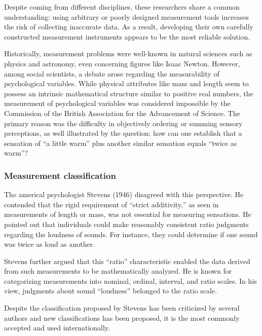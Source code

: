 \documentclass[
  letterpaper,
  DIV=11,
  numbers=noendperiod]{scrartcl}
\begin{document}
Despite coming from different disciplines, these researchers share a
common understanding: using arbitrary or poorly designed measurement
tools increases the risk of collecting inaccurate data. As a result,
developing their own carefully constructed measurement instruments
appears to be the most reliable solution.

Historically, measurement problems were well-known in natural sciences
such as physics and astronomy, even concerning figures like Isaac
Newton. However, among social scientists, a debate arose regarding the
measurability of psychological variables. While physical attributes like
mass and length seem to possess an intrinsic mathematical structure
similar to positive real numbers, the measurement of psychological
variables was considered impossible by the Commission of the British
Association for the Advancement of Science. The primary reason was the
difficulty in objectively ordering or summing sensory perceptions, as
well illustrated by the question: how can one establish that a sensation
of ``a little warm'' plus another similar sensation equals ``twice as
warm''?

\hypertarget{measurement-classification}{%
\subsubsection*{Measurement
classification}\label{measurement-classification}}

The americal psychologist Stevens (1946) disagreed with this
perspective. He contended that the rigid requirement of ``strict
additivity,'' as seen in measurements of length or mass, was not
essential for measuring sensations. He pointed out that individuals
could make reasonably consistent ratio judgments regarding the loudness
of sounds. For instance, they could determine if one sound was twice as
loud as another.

Stevens further argued that this ``ratio'' characteristic enabled the
data derived from such measurements to be mathematically analyzed. He is
known for categorizing measurements into nominal, ordinal, interval, and
ratio scales. In his view, judgments about sound ``loudness'' belonged
to the ratio scale.

Despite the classification proposed by Stevens has been criticized by
several authors and new classifications has been proposed, it is the
most commonly accepted and used internationally.
\end{document}
